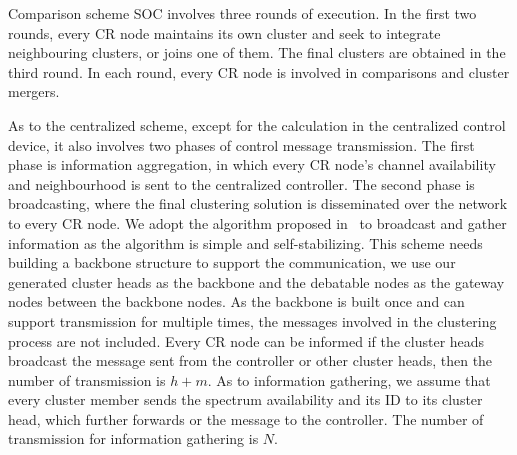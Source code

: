 \documentclass[10pt,journal,compsoc]{IEEEtran}
\theoremstyle{mytheoremstyle}
\theoremstyle{mytheoremstyle}
\theoremstyle{mytheoremstyle}
\begin{document}
Comparison scheme SOC involves three rounds of execution. 
In the first two rounds, every CR node maintains its own cluster and seek to integrate neighbouring clusters, or joins one of them.
The final clusters are obtained in the third round. 
In each round, every CR node is involved in comparisons and cluster mergers.

As to the centralized scheme, except for the calculation in the centralized control device, it also involves two phases of control message transmission.
The first phase is information aggregation, in which every CR node's channel availability and neighbourhood is sent to the centralized controller.
The second phase is broadcasting, where the final clustering solution is disseminated over the network to every CR node.
We adopt the algorithm proposed in~\cite{Efficient_broadcasting_gathering_adhoc} to broadcast and gather information as the algorithm is simple and self-stabilizing.
This scheme needs building a backbone structure to support the communication, we use our generated cluster heads as the backbone and the debatable nodes as the gateway nodes between the backbone nodes.
As the backbone is built once and can support transmission for multiple times, the messages involved in the clustering process are not included.
Every CR node can be informed if the cluster heads broadcast the message sent from the controller or other cluster heads, then the number of transmission is $h+m$.
As to information gathering, we assume that every cluster member sends the spectrum availability and its ID to its cluster head, which further forwards or the message to the controller.
The number of transmission for information gathering is $N$.


\end{document}
